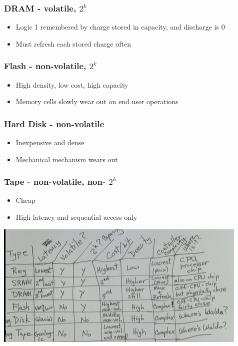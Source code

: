 \documentclass{article}
\begin{document}
\subsubsection{DRAM - volatile, $2^k$}

\begin{itemize}
    \item Logic 1 remembered by charge stored in capacity, and discharge is 0
    
    \item Must refresh each stored charge often 
\end{itemize}

\subsubsection{Flash - non-volatile, $2^k$}

\begin{itemize}
    \item High density, low cost, high capacity
    
    \item Memory cells slowly wear out on end user operations
\end{itemize}

\subsubsection{Hard Disk - non-volatile}

\begin{itemize}
    \item Inexpensive and dense
    
    \item Mechanical mechanism wears out 
\end{itemize}

\subsubsection{Tape - non-volatile, non- $2^k$}

\begin{itemize}
    \item Cheap
    \item High latency and sequential access only
\end{itemize}

\includegraphics[]{images/table.png}
\end{document}
